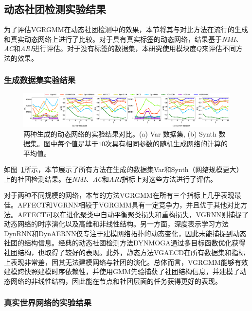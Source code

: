 \subsection{动态社团检测实验结果}



为了评估VGRGMM在动态社团检测中的效果，本节将其与对比方法在流行的生成和真实动态网络上进行了比较。对于具有真实标签的动态网络，结果基于\emph{NMI}、\emph{AC}和\emph{ARI}进行评估。对于没有标签的数据集，本研究使用模块度$Q$来评估不同方法的效果。



\subsubsection{生成数据集实验结果}

\begin{figure}[htbp]
    \centering
    \hspace{-2mm}
    \includegraphics[width=1\textwidth]{figures/chap06/synthData.pdf}
    \caption{两种生成的动态网络的实验结果对比。(a) Var 数据集, (b) Synth 数据集。图中每个值是基于$10$次具有相同参数的随机生成网络的计算的平均值。}
    \label{fig:gene}
\end{figure}

如图~\ref{fig:gene}所示，本节展示了所有方法在生成的数据集Var和Synth（网络规模更大）上的社团检测结果。在\emph{NMI}、\emph{AC}和\emph{ARI}指标上对这些方法进行了评估。

对于两种不同规模的网络，本节的方法VGRGMM在所有三个指标上几乎表现最佳。AFFECT和VGRNN相较于VGRGMM具有一定竞争力，并且优于其他对比方法。AFFECT可以在进化聚类中自动平衡聚类损失和重构损失，VGRNN则捕捉了动态网络的时序演化以及高维和非线性结构。另一方面，深度表示学习方法DynRNN和DynAERNN仅专注于建模网络拓扑的动态变化，因此未能捕捉到动态社团的结构信息。经典的动态社团检测方法DYNMOGA通过多目标函数优化获得社团结构，也取得了较好的表现。此外，静态方法VGAECD在所有数据集和指标上表现非常差，因其无法建模网络与社团的演化。总体而言，VGRGMM能够有效建模跨快照建模时序依赖性，并使用GMM先验捕获了社团结构信息，并建模了动态网络的非线性结构，因此能在节点和社团层面的任务获得更好的表现。



\subsubsection{真实世界网络的实验结果}


